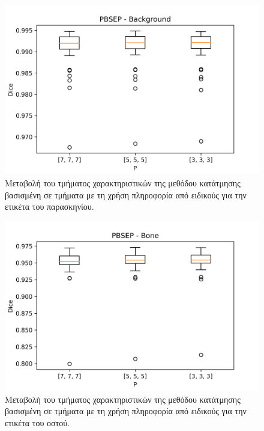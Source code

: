 \documentclass[a4paper,12pt]{article}
\begin{document}
\begin{figure}[H]
    \centering
    \includegraphics[width=0.85\linewidth]{PBSEP_P_Background_plot.png}
    \caption{Μεταβολή του τμήματος χαρακτηριστικών της μεθόδου κατάτμησης
             βασισμένη σε τμήματα με τη χρήση πληροφορία από ειδικούς για την
             ετικέτα του παρασκηνίου.}
    \label{fig:PBSEP:P:1}
\end{figure}

\begin{figure}[H]
    \centering
    \includegraphics[width=0.85\linewidth]{PBSEP_P_Bone_plot.png}
    \caption{Μεταβολή του τμήματος χαρακτηριστικών της μεθόδου κατάτμησης
             βασισμένη σε τμήματα με τη χρήση πληροφορία από ειδικούς για την
             ετικέτα του οστού.}
    \label{fig:PBSEP:P:2}
\end{figure}
\end{document}
